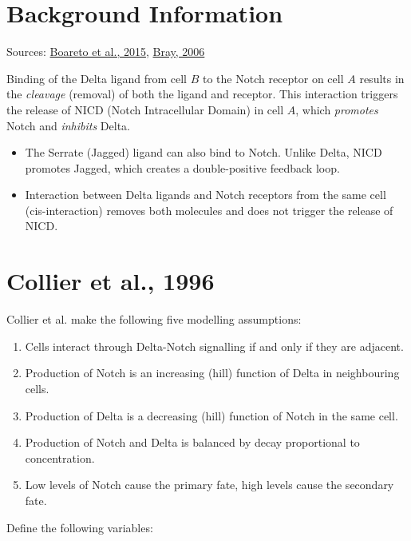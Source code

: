 \documentclass{article}
\begin{document}
\begin{flushleft}

\section{Background Information}

Sources: \href{https://www.pnas.org/doi/full/10.1073/pnas.1416287112}{Boareto et al., 2015}, \href{https://www.nature.com/articles/nrm2009}{Bray, 2006}

\medskip

Binding of the Delta ligand from cell $B$ to the Notch receptor on cell $A$ results in the \emph{cleavage} (removal) of both the ligand and receptor. This interaction triggers the release of NICD (Notch Intracellular Domain) in cell $A$, which \emph{promotes} Notch and \emph{inhibits} Delta.

\begin{itemize}
  \item The Serrate (Jagged) ligand can also bind to Notch. Unlike Delta, NICD promotes Jagged, which creates a double-positive feedback loop.
  \item Interaction between Delta ligands and Notch receptors from the same cell (cis-interaction) removes both molecules and does not trigger the release of NICD.
\end{itemize}

\section{Collier et al., 1996}

Collier et al. make the following five modelling assumptions:
\begin{enumerate}
  \item Cells interact through Delta-Notch signalling if and only if they are adjacent.
  \item Production of Notch is an increasing (hill) function of Delta in neighbouring cells.
  \item Production of Delta is a decreasing (hill) function of Notch in the same cell.
  \item Production of Notch and Delta is balanced by decay proportional to concentration.
  \item Low levels of Notch cause the primary fate, high levels cause the secondary fate.
\end{enumerate}

Define the following variables:


\end{flushleft}
\end{document}
